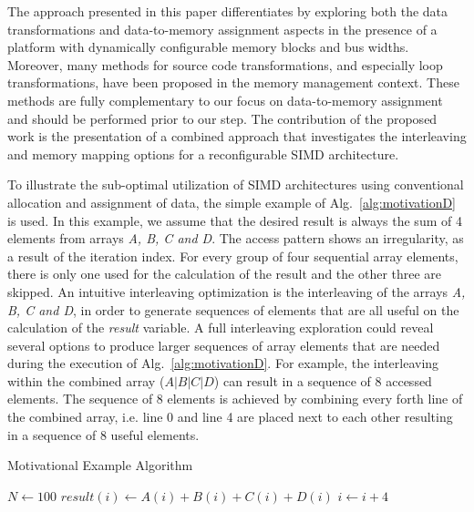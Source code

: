 The approach presented in this paper differentiates by exploring both the data transformations and data-to-memory assignment aspects in the presence of a platform with dynamically configurable memory blocks and bus widths. 
Moreover, many methods for source code transformations, and especially loop transformations, have been proposed in the memory management context. 
These methods are fully complementary to our focus on data-to-memory assignment and should be performed prior to our step.
The contribution of the proposed work is the presentation of a combined approach that investigates the interleaving and memory mapping options for a reconfigurable SIMD architecture.  

To illustrate the sub-optimal utilization of SIMD architectures using conventional allocation and assignment of data, the simple example of Alg.~\ref{alg:motivationD} is used.
In this example, we assume that the desired result is always the sum of 4 elements from arrays \textit{A, B, C and D}. 
The access pattern shows an irregularity, as a result of the iteration index.
For every group of four sequential array elements, there is only one used for the calculation of the result and the other three are skipped.
An intuitive interleaving optimization is the interleaving of the arrays \textit{A, B, C and D}, in order to generate sequences of elements that are all useful on the calculation of the \textit{result} variable. 
A full interleaving exploration could reveal several options to produce larger sequences of array elements that are needed during the execution of Alg.~\ref{alg:motivationD}.
For example, the interleaving within the combined array ($A\vert B\vert C\vert D$) can result in a sequence of 8 accessed elements.
The sequence of 8 elements is achieved by combining every forth line of the combined array, i.e. line 0 and line 4 are placed next to each other resulting in a sequence of 8 useful elements.

\begin{algorithm}
\caption{Motivational Example Algorithm}
\label{alg:motivationD}
\begin{algorithmic}[1]
\STATE $N \gets 100$ 
\STATE $result(i) \gets A(i) + B(i) + C(i) + D(i) $
\STATE $i \gets i + 4$ 
\ENDFOR
 \end{algorithmic}
\end{algorithm}

